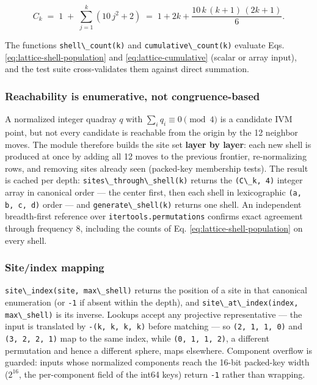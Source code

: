 \documentclass[
  10pt,
]{article}
\newcommand{\passthrough}[1]{#1}
\begin{document}
\begin{equation}\label{eq:lattice-cumulative}
C_k \;=\; 1 \;+\; \sum_{j=1}^{k} \left(10\,j^{2} + 2\right) \;=\; 1 + 2k + \frac{10\,k\,(k+1)\,(2k+1)}{6}.
\end{equation}

The functions \passthrough{\lstinline!shell\_count(k)!} and
\passthrough{\lstinline!cumulative\_count(k)!} evaluate Eqs.
\eqref{eq:lattice-shell-population} and \eqref{eq:lattice-cumulative}
(scalar or array input), and the test suite cross-validates them against
direct summation.

\subsubsection{Reachability is enumerative, not
congruence-based}\label{reachability-is-enumerative-not-congruence-based}

A normalized integer quadray \(q\) with \(\sum_i q_i \equiv 0 \pmod 4\)
is a candidate IVM point, but not every candidate is reachable from the
origin by the 12 neighbor moves. The module therefore builds the site
set \textbf{layer by layer}: each new shell is produced at once by
adding all 12 moves to the previous frontier, re-normalizing rows, and
removing sites already seen (packed-key membership tests). The result is
cached per depth: \passthrough{\lstinline!sites\_through\_shell(k)!}
returns the \passthrough{\lstinline!(C\_k, 4)!} integer array in
canonical order --- the center first, then each shell in lexicographic
\passthrough{\lstinline!(a, b, c, d)!} order --- and
\passthrough{\lstinline!generate\_shell(k)!} returns one shell. An
independent breadth-first reference over
\passthrough{\lstinline!itertools.permutations!} confirms exact
agreement through frequency 8, including the counts of Eq.
\eqref{eq:lattice-shell-population} on every shell.

\subsubsection{Site/index mapping}\label{siteindex-mapping}

\passthrough{\lstinline!site\_index(site, max\_shell)!} returns the
position of a site in that canonical enumeration (or
\passthrough{\lstinline!-1!} if absent within the depth), and
\passthrough{\lstinline!site\_at\_index(index, max\_shell)!} is its
inverse. Lookups accept any projective representative --- the input is
translated by \passthrough{\lstinline!-(k, k, k, k)!} before matching
--- so \passthrough{\lstinline!(2, 1, 1, 0)!} and
\passthrough{\lstinline!(3, 2, 2, 1)!} map to the same index, while
\passthrough{\lstinline!(0, 1, 1, 2)!}, a different permutation and
hence a different sphere, maps elsewhere. Component overflow is guarded:
inputs whose normalized components reach the 16-bit packed-key width
(\(2^{16}\), the per-component field of the int64 keys) return
\passthrough{\lstinline!-1!} rather than wrapping.
\end{document}

